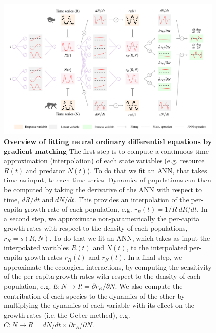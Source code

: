 \documentclass[11pt, oneside]{article}
\begin{document}
\newpage
\begin{figure}[H]
\includegraphics[width=\linewidth,page=1]{figures/main.pdf}
\caption{
    \textbf{Overview of fitting neural ordinary differential equations by gradient matching}
    The first step is to compute a continuous time approximation (interpolation) of each state variables (e.g. resource $R(t)$ and predator $N(t)$).
    To do that we fit an ANN, that takes time as input, to each time series.
    Dynamics of populations can then be computed by taking the derivative of the ANN with respect to time, $dR/dt$ and $dN/dt$.
    This provides an interpolation of the per-capita growth rate of each population, e.g. $r_R(t) = 1/R~dR/dt$.
    In a second step, we approximate non-parametrically the per-capita growth rates with respect to the density of each populations, $r_R = s(R,N)$.
    To do that we fit an ANN, which takes as input the interpolated variables $R(t)$ and $N(t)$, to the interpolated per-capita growth rates $r_R(t)$ and $r_N(t)$.
    In a final step, we approximate the ecological interactions, by computing the sensitivity of the per-capita growth rates with respect to the density of each population, e.g. $E: N \rightarrow R = \partial r_R / \partial N$.
    We also compute the contribution of each species to the dynamics of the other by multiplying the dynamics of each variable with its effect on the growth rates (i.e. the Geber method), e.g. $C: N \rightarrow R = dN/dt \times \partial r_R / \partial N$.
}
\end{figure}
\newpage
\end{document}
